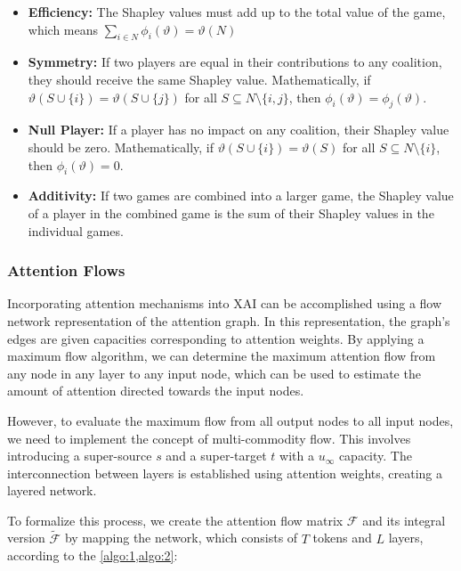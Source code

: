 \documentclass{article} %
\theoremstyle{bfnote}
\begin{document}
\begin{itemize}
	
	\item \textbf{Efficiency:} The Shapley values must add up to the total value of the game, which means $\sum_{i \in N} \phi_i(\vartheta) = \vartheta(N)$
	\item \textbf{Symmetry:} If two players are equal in their contributions to any coalition, they should receive the same Shapley value. Mathematically, if \(\vartheta(S \cup \{i\}) = \vartheta(S \cup \{j\})\) for all \(S \subseteq N \setminus \{i, j\}\), then \(\phi_i(\vartheta) = \phi_j(\vartheta)\).
	\item \textbf{Null Player:} If a player has no impact on any coalition, their Shapley value should be zero. Mathematically, if \(\vartheta(S \cup \{i\}) = \vartheta(S)\) for all \(S \subseteq N \setminus \{i\}\), then \(\phi_i(\vartheta) = 0\).
	\item \textbf{Additivity:} If two games are combined into a larger game, the Shapley value of a player in the combined game is the sum of their Shapley values in the individual games.
	
\end{itemize}

\subsubsection{Attention Flows}
Incorporating attention mechanisms into XAI can be accomplished using a flow network representation of the attention graph. In this representation, the graph's edges are given capacities corresponding to attention weights. By applying a maximum flow algorithm, we can determine the maximum attention flow from any node in any layer to any input node, which can be used to estimate the amount of attention directed towards the input nodes.

However, to evaluate the maximum flow from all output nodes to all input nodes, we need to implement the concept of multi-commodity flow. This involves introducing a super-source $s$ and a super-target $t$ with a $u_{\infty}$ capacity. The interconnection between layers is established using attention weights, creating a layered network.

To formalize this process, we create the attention flow matrix $\mathcal{F}$ and its integral version $\widetilde{\mathcal{F}}$ by mapping the network, which consists of $T$ tokens and $L$ layers, according to the \cref{algo:1,algo:2}:
\end{document}
